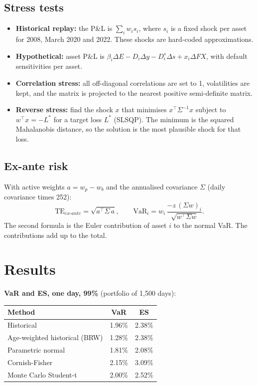 \documentclass[11pt,a4paper]{article}
\begin{document}
\subsection{Stress tests}
\begin{itemize}
\item \textbf{Historical replay:} the P\&L is $\sum_i w_i s_i$, where $s_i$ is a fixed shock per asset for 2008, March 2020 and 2022. These shocks are hard-coded approximations.
\item \textbf{Hypothetical:} asset P\&L is $\beta_i\Delta E - D_i\Delta y - D^{s}_i\Delta s + x_i\Delta FX$, with default sensitivities per asset.
\item \textbf{Correlation stress:} all off-diagonal correlations are set to 1, volatilities are kept, and the matrix is projected to the nearest positive semi-definite matrix.
\item \textbf{Reverse stress:} find the shock $x$ that minimises $x^\top\Sigma^{-1}x$ subject to $w^\top x=-L^*$ for a target loss $L^*$ (SLSQP). The minimum is the squared Mahalanobis distance, so the solution is the most plausible shock for that loss.
\end{itemize}

\subsection{Ex-ante risk}
With active weights $a=w_p-w_b$ and the annualised covariance $\Sigma$ (daily covariance times 252):
\[
\mathrm{TE}_{ex\text{-}ante}=\sqrt{a^\top\Sigma\,a},\qquad
\mathrm{VaR}_i=w_i\,\frac{-z\,(\Sigma w)_i}{\sqrt{w^\top\Sigma w}} .
\]
The second formula is the Euler contribution of asset $i$ to the normal VaR. The contributions add up to the total.

\section{Results}
\textbf{VaR and ES, one day, 99\%} (portfolio of 1,500 days):

\begin{center}
\begin{tabular}{@{}lcc@{}}
\toprule
Method & VaR & ES \\
\midrule
Historical & 1.96\% & 2.38\% \\
Age-weighted historical (BRW) & 1.28\% & 2.38\% \\
Parametric normal & 1.81\% & 2.08\% \\
Cornish-Fisher & 2.15\% & 3.09\% \\
Monte Carlo Student-t & 2.00\% & 2.52\% \\
\bottomrule
\end{tabular}
\end{center}
\end{document}
